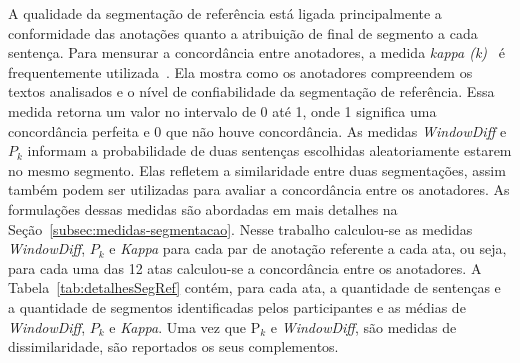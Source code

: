 A qualidade da segmentação de referência está ligada principalmente a conformidade das anotações quanto a atribuição de final de segmento a cada sentença.
Para mensurar a concordância entre anotadores, a medida \textit{kappa (k)}~\cite{Carletta1996} é frequentemente utilizada~\cite{Gruenstein2007, Cardoso2017, Hearst1997}. Ela mostra como os anotadores compreendem os textos analisados e o nível de confiabilidade da segmentação de referência. Essa medida retorna um valor no intervalo de 0 até 1, onde 1 significa uma concordância perfeita e 0 que não houve concordância. 
As medidas \textit{WindowDiff} e $P_k$ informam a probabilidade de duas sentenças escolhidas aleatoriamente estarem no mesmo segmento. Elas refletem a similaridade entre duas segmentações, assim também podem ser utilizadas para avaliar a concordância entre os anotadores. As formulações dessas medidas são abordadas em mais detalhes na Seção~\ref{subsec:medidas-segmentacao}.
%
%
Nesse trabalho calculou-se as medidas \textit{WindowDiff}, $P_k$ e \textit{Kappa} para cada par de anotação referente a cada ata, ou seja, para cada uma das 12 atas calculou-se a concordância entre os anotadores.  
A Tabela~\ref{tab:detalhesSegRef} contém, para cada ata, a quantidade de sentenças e a quantidade de segmentos identificadas pelos participantes e as médias de \textit{WindowDiff}, $P_k$ e \textit{Kappa}. Uma vez que P$_k$ e \textit{WindowDiff}, são medidas de dissimilaridade, são reportados os seus complementos.









